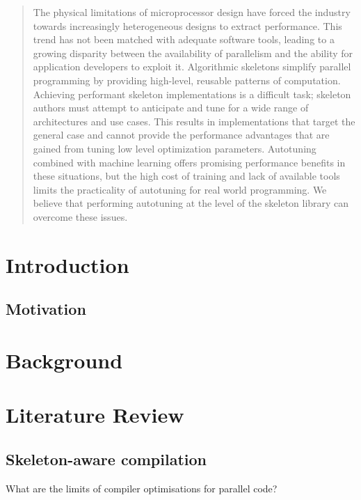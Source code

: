 \begin{abstract}
  The physical limitations of microprocessor design have forced the
  industry towards increasingly heterogeneous designs to extract
  performance. This trend has not been matched with adequate software
  tools, leading to a growing disparity between the availability of
  parallelism and the ability for application developers to exploit
  it. Algorithmic skeletons simplify parallel programming by providing
  high-level, reusable patterns of computation. Achieving performant
  skeleton implementations is a difficult task; skeleton authors must
  attempt to anticipate and tune for a wide range of architectures and
  use cases. This results in implementations that target the general
  case and cannot provide the performance advantages that are gained
  from tuning low level optimization parameters. Autotuning combined
  with machine learning offers promising performance benefits in these
  situations, but the high cost of training and lack of available
  tools limits the practicality of autotuning for real world
  programming. We believe that performing autotuning at the level of
  the skeleton library can overcome these issues.
\end{abstract}


\section{Introduction}

\subsection{Motivation}


\section{Background}


\section{Literature Review}


\subsection{Skeleton-aware compilation}

What are the limits of compiler optimisations for parallel code?

